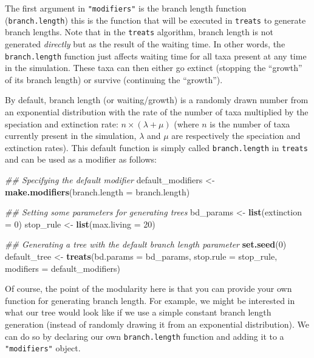 \documentclass[
]{book}
\newenvironment{Shaded}{\begin{snugshade}}{\end{snugshade}}
\newcommand{\CommentTok}[1]{\textcolor[rgb]{0.56,0.35,0.01}{\textit{#1}}}
\newcommand{\DataTypeTok}[1]{\textcolor[rgb]{0.13,0.29,0.53}{#1}}
\newcommand{\DecValTok}[1]{\textcolor[rgb]{0.00,0.00,0.81}{#1}}
\newcommand{\KeywordTok}[1]{\textcolor[rgb]{0.13,0.29,0.53}{\textbf{#1}}}
\newcommand{\NormalTok}[1]{#1}
\newcommand{\StringTok}[1]{\textcolor[rgb]{0.31,0.60,0.02}{#1}}
\begin{document}
The first argument in \texttt{"modifiers"} is the branch length function (\texttt{branch.length}) this is the function that will be executed in \texttt{treats} to generate branch lengths.
Note that in the \texttt{treats} algorithm, branch length is not generated \emph{directly} but as the result of the waiting time.
In other words, the \texttt{branch.length} function just affects waiting time for all taxa present at any time in the simulation.
These taxa can then either go extinct (stopping the ``growth'' of its branch length) or survive (continuing the ``growth'').

By default, branch length (or waiting/growth) is a randomly drawn number from an exponential distribution with the rate of the number of taxa multiplied by the speciation and extinction rate: \(n \times (\lambda + \mu)\) (where \(n\) is the number of taxa currently present in the simulation, \(\lambda\) and \(\mu\) are respectively the speciation and extinction rates).
This default function is simply called \texttt{branch.length} in \texttt{treats} and can be used as a modifier as follows:

\begin{Shaded}
\begin{Highlighting}[]
\CommentTok{\#\# Specifying the default modifier}
\NormalTok{default\_modifiers \textless{}{-}}\StringTok{ }\KeywordTok{make.modifiers}\NormalTok{(}\DataTypeTok{branch.length =}\NormalTok{ branch.length)}

\CommentTok{\#\# Setting some parameters for generating trees}
\NormalTok{bd\_params \textless{}{-}}\StringTok{ }\KeywordTok{list}\NormalTok{(}\DataTypeTok{extinction =} \DecValTok{0}\NormalTok{)}
\NormalTok{stop\_rule \textless{}{-}}\StringTok{ }\KeywordTok{list}\NormalTok{(}\DataTypeTok{max.living =} \DecValTok{20}\NormalTok{)}

\CommentTok{\#\# Generating a tree with the default branch length parameter}
\KeywordTok{set.seed}\NormalTok{(}\DecValTok{0}\NormalTok{)}
\NormalTok{default\_tree \textless{}{-}}\StringTok{ }\KeywordTok{treats}\NormalTok{(}\DataTypeTok{bd.params =}\NormalTok{ bd\_params,}
                     \DataTypeTok{stop.rule =}\NormalTok{ stop\_rule,}
                     \DataTypeTok{modifiers =}\NormalTok{ default\_modifiers)}
\end{Highlighting}
\end{Shaded}

Of course, the point of the modularity here is that you can provide your own function for generating branch length.
For example, we might be interested in what our tree would look like if we use a simple constant branch length generation (instead of randomly drawing it from an exponential distribution).
We can do so by declaring our own \texttt{branch.length} function and adding it to a \texttt{"modifiers"} object.
\end{document}
